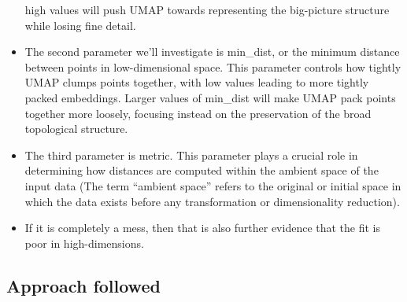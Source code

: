 \documentclass[
  12pt]{article}
\begin{document}
\begin{itemize}
  high values will push UMAP towards representing the big-picture
  structure while losing fine detail.
\item
  The second parameter we'll investigate is min\_dist, or the minimum
  distance between points in low-dimensional space. This parameter
  controls how tightly UMAP clumps points together, with low values
  leading to more tightly packed embeddings. Larger values of min\_dist
  will make UMAP pack points together more loosely, focusing instead on
  the preservation of the broad topological structure.
\item
  The third parameter is metric. This parameter plays a crucial role in
  determining how distances are computed within the ambient space of the
  input data (The term ``ambient space'' refers to the original or
  initial space in which the data exists before any transformation or
  dimensionality reduction).
\item
  If it is completely a mess, then that is also further evidence that
  the fit is poor in high-dimensions.
\end{itemize}

\hypertarget{approach-followed}{%
\subsection{Approach followed}\label{approach-followed}}
\end{document}
